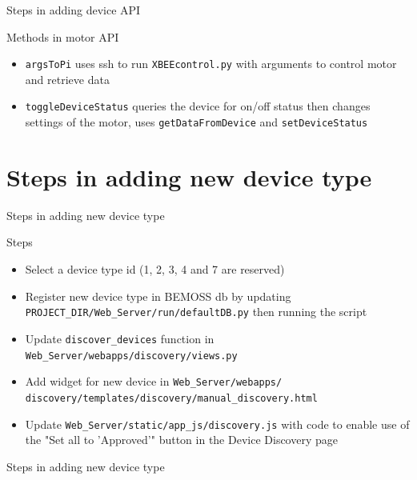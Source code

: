 \documentclass{beamer}
\begin{document}
\begin{frame}{Steps in adding device API}{}
\begin{block}{Methods in motor API}
\begin{itemize}
	\item \texttt{argsToPi} uses ssh to run \texttt{XBEEcontrol.py} with arguments to control motor and retrieve data
	\item \texttt{toggleDeviceStatus} queries the device for on/off status then changes settings of the motor, uses \texttt{getDataFromDevice} and \texttt{setDeviceStatus}
\end{itemize}
\end{block}
\end{frame}

\section{Steps in adding new device type}
\begin{frame}{Steps in adding new device type}{}
\begin{block}{Steps}
\begin{itemize}
\item Select a device type id (1, 2, 3, 4 and 7 are reserved)
\item Register new device type in BEMOSS db by updating \texttt{PROJECT\_DIR/Web\_Server/run/defaultDB.py} then running the script
\item Update \texttt{discover\_devices} function in \texttt{Web\_Server/webapps/discovery/views.py}
\item Add widget for new device in \texttt{Web\_Server/webapps/
discovery/templates/discovery/manual\_discovery.html}
\item Update \texttt{Web\_Server/static/app\_js/discovery.js} with code to enable use of the "Set all to 'Approved'" button in the Device Discovery page
\end{itemize}
\end{block}
\end{frame}

\begin{frame}{Steps in adding new device type}{}
\end{frame}
\end{document}
